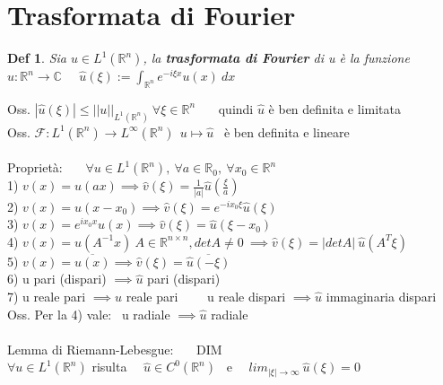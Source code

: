 \documentclass{article}
\theoremstyle{unnumbered}
\newtheorem* {theoremT}{Def}
\theoremstyle{unnumbered1}
\newenvironment{defi}{\begin{gBox}\begin{theoremT}}{\end{theoremT}\end{gBox}}
\renewcommand{\hat}{\widehat}
\begin{document}
\newpage



\section{Trasformata di Fourier}

\begin{defi}
Sia $u\in L^1(\mathbb{R}^n)$, la \textbf{trasformata di Fourier} di u è la funzione \ $\hat{u}:\mathbb{R}^n\to\mathbb{C}$ \ \ $\hat{u}(\xi):=\int_{\mathbb{R}^n}e^{-i\xi x}u(x)\ dx$
\end{defi}
%
%
Oss. $|\hat{u}(\xi)|\le||u||_{L^1(\mathbb{R}^n)} \ \forall \xi\in\mathbb{R}^n$ \ \ \ quindi $\hat{u}$ è ben definita e limitata\\
%
Oss. $\mathcal{F}:L^1(\mathbb{R}^n)\to L^{\infty}(\mathbb{R}^n) \ \ u\mapsto \hat{u}$ \ è ben definita e lineare\\ \\
%
%
%
%
Proprietà: \ \ \ $\forall u\in L^1(\mathbb{R}^n), \ \forall a \in \mathbb{R}_0, \ \forall x_0\in\mathbb{R}^n$\\
%
1) $v(x)=u(ax) \implies \hat{v}(\xi)=\frac{1}{|a|}\hat{u}(\frac{\xi}{a})$\\
%
2) $v(x)=u(x-x_0) \implies \hat{v}(\xi)= e^{-ix_0\xi}\hat{u}(\xi)$\\
%
3) $v(x)=e^{ix_0x}u(x) \implies \hat{v}(\xi)= \hat{u}(\xi-x_0)$\\
%
4) $v(x)=u(A^{-1}x) \ A\in\mathbb{R}^{n\times n}, detA\ne0 \ \implies \hat{v}(\xi)=|detA|\ \hat{u}(A^T\xi)$\\
%
5) $v(x)=\overline{u(x)} \implies \hat{v}(\xi)=\overline{ \hat{u}(-\xi)}$\\
%
6) u pari (dispari) $\implies \hat{u}$ pari (dispari)\\
%
7) u reale pari $\implies \hat{u}$ reale pari \ \ \ \ u reale dispari $\implies \hat{u}$ immaginaria dispari\\
%
Oss. Per la 4) vale: \ u radiale $\implies \hat{u}$ radiale\\ \\
%
%
Lemma di Riemann-Lebesgue: \ \ \ DIM\\
$\forall u\in L^1(\mathbb{R}^n)$ risulta \ \ $\hat{u}\in C^0(\mathbb{R}^n)$ \ e \ \ $lim_{|\xi|\to \infty} \ \hat{u}(\xi)=0$\\
\end{document}
